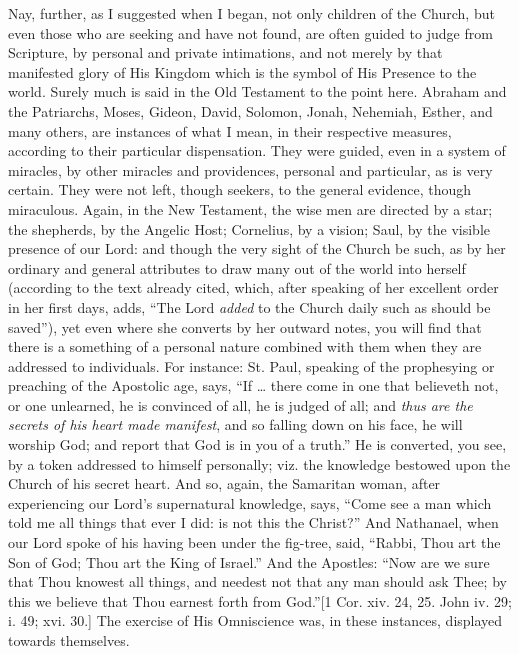 Nay, further, as I suggested when I began, not only children of the
Church, but even those who are seeking and have not found, are often
guided to judge from Scripture, by personal and private intimations,
and not merely by that manifested glory of His Kingdom which is the
symbol of His Presence to the world. Surely much is said in the Old
Testament to the point here. Abraham and the Patriarchs, Moses,
Gideon, David, Solomon, Jonah, Nehemiah, Esther, and many others, are
instances of what I mean, in their respective measures, according to
their particular dispensation. They were guided, even in a system of
miracles, by other miracles and providences, personal and particular,
as is very certain. They were not left, though seekers, to the general
evidence, though miraculous. Again, in the New Testament, the wise men
are directed by a star; the shepherds, by the Angelic Host; Cornelius,
by a vision; Saul, by the visible presence of our Lord: and though the
very sight of the Church be such, as by her ordinary and general
attributes to draw many out of the world into herself (according to
the text already cited, which, after speaking of her excellent order
in her first days, adds, ``The Lord \emph{added} to the Church
daily such as should be saved''), yet even where she converts by
her outward notes, you will find that there is a something of a
personal nature combined with them when they are addressed to
individuals. For instance: St. Paul, speaking of the prophesying or
preaching of the Apostolic age, says, ``If … there come in one
that believeth not, or one unlearned, he is convinced of all, he is
judged of all; and \emph{thus are the secrets of his heart made manifest},
and so falling down on his face, he will worship God; and report that
God is in you of a truth.'' He is converted, you see, by a token
addressed to himself personally; viz. the knowledge bestowed upon the
Church of his secret heart. And so, again, the Samaritan woman, after
experiencing our Lord's supernatural knowledge, says, ``Come see a
man which told me all things that ever I did: is not this the
Christ?'' And Nathanael, when our Lord spoke of his having been
under the fig-tree, said, ``Rabbi, Thou art the Son of God; Thou
art the King of Israel.'' And the Apostles: ``Now are we sure
that Thou knowest all things, and needest not that any man should ask
Thee; by this we believe that Thou earnest forth from God.''[1 Cor.
xiv. 24, 25. John iv. 29; i. 49; xvi. 30.] The exercise of His
Omniscience was, in these instances, displayed towards themselves.

